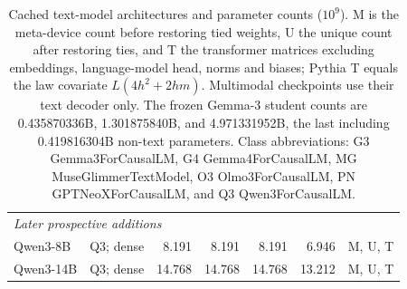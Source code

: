 \begin{table}[!htbp]
\begin{tabular*}{\textwidth}{@{\extracolsep{\fill}}llrrrrr@{}}
\midrule
\multicolumn{7}{l}{\textit{Later prospective additions}} \\
Qwen3-8B & Q3; dense & 8.191 & 8.191 & 8.191 & 6.946 & M, U, T \\
Qwen3-14B & Q3; dense & 14.768 & 14.768 & 14.768 & 13.212 & M, U, T \\
\bottomrule
\end{tabular*}
\caption{Cached text-model architectures and parameter counts ($10^9$). M is the meta-device count before restoring tied weights, U the unique count after restoring ties, and T the transformer matrices excluding embeddings, language-model head, norms and biases; Pythia T equals the law covariate $L(4h^2+2hm)$. Multimodal checkpoints use their text decoder only. The frozen Gemma-3 student counts are 0.435870336B, 1.301875840B, and 4.971331952B, the last including 0.419816304B non-text parameters. Class abbreviations: G3 Gemma3ForCausalLM, G4 Gemma4ForCausalLM, MG MuseGlimmerTextModel, O3 Olmo3ForCausalLM, PN GPTNeoXForCausalLM, and Q3 Qwen3ForCausalLM.}
\label{tab:model_arch}
\end{table}
